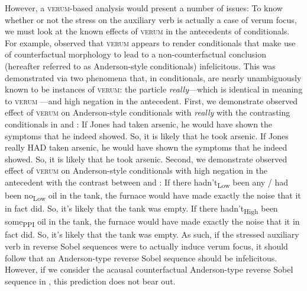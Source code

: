 However, a {\scshape verum}-based analysis would present a number of issues: To know whether or not the stress on the auxiliary verb is actually a case of verum focus, we must look at the known effects of {\scshape verum} in the antecedents of conditionals. For example, \textcite[p.~533]{Romero2015} observed that {\scshape verum} appears to render conditionals that make use of counterfactual morphology to lead to a non-counterfactual conclusion (hereafter referred to as Anderson-style conditionals) infelicitous. This was demonstrated via two phenomena that, in conditionals, are nearly unambiguously known to be instances of {\scshape verum}: the particle \textit{really}---which is identical in meaning to {\scshape verum} \parencite[p.~625]{Romero2004}---and high negation in the antecedent. First, we demonstrate  observed effect of {\scshape verum} on Anderson-style conditionals with \textit{really} with the contrasting conditionals in  and :
\pex[nopreamble=true]
\a{} If Jones had taken arsenic, he would have shown the symptoms that he indeed showed. So, it is likely that he took arsenic.\hfill\parencite{Anderson1951}
\a{}\ljudge{\#} If Jones really \MakeUppercase{had} taken arsenic, he would have shown the symptoms that he indeed showed. So, it is likely that he took arsenic.
\xe
Second, we demonstrate  observed effect of {\scshape verum} on Anderson-style conditionals with high negation in the antecedent with the contrast between  and :
\pex[nopreamble=true]
\a{} If there hadn’t\textsubscript{Low} been any / had been no\textsubscript{Low} oil in the tank, the furnace would have made exactly the noise that it in fact did. So, it’s likely that the tank was empty.\hfill\parencite[p.~521]{Romero2015}
\a{} \ljudge{\#} If there hadn’t\textsubscript{High} been some\textsubscript{PPI} oil in the tank, the furnace would have made exactly the noise that it in fact did. So, it’s likely that the tank was empty.\hfill\parencite[p.~521]{Romero2015}
\xe
As such, if the stressed auxiliary verb in reverse Sobel sequences were to actually induce verum focus, it should follow that an Anderson-type reverse Sobel sequence should be infelicitous. However, if we consider the acausal counterfactual Anderson-type reverse Sobel sequence in , this prediction does not bear out.
